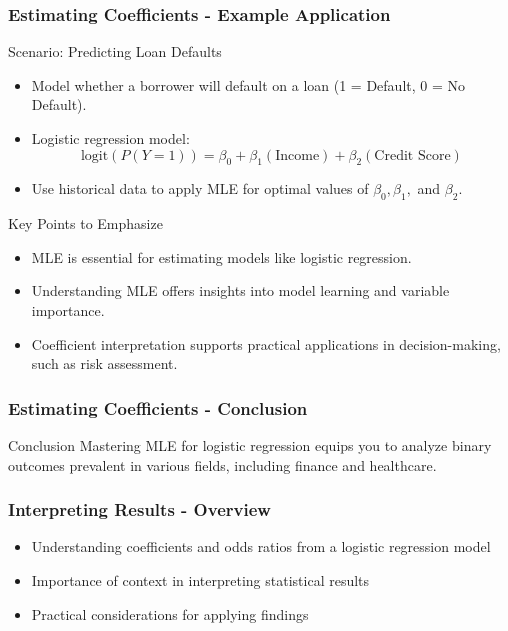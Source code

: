 \documentclass[aspectratio=169]{beamer}
\begin{document}
\begin{frame}[fragile]
    \frametitle{Estimating Coefficients - Example Application}
    \begin{block}{Scenario: Predicting Loan Defaults}
        \begin{itemize}
            \item Model whether a borrower will default on a loan (1 = Default, 0 = No Default).
            \item Logistic regression model:
                \begin{equation}
                    \text{logit}(P(Y=1)) = \beta_0 + \beta_1 (\text{Income}) + \beta_2 (\text{Credit Score})
                \end{equation}
            \item Use historical data to apply MLE for optimal values of \( \beta_0, \beta_1, \) and \( \beta_2 \).
        \end{itemize}
    \end{block}

    \begin{block}{Key Points to Emphasize}
        \begin{itemize}
            \item MLE is essential for estimating models like logistic regression.
            \item Understanding MLE offers insights into model learning and variable importance.
            \item Coefficient interpretation supports practical applications in decision-making, such as risk assessment.
        \end{itemize}
    \end{block}
\end{frame}

\begin{frame}[fragile]
    \frametitle{Estimating Coefficients - Conclusion}
    \begin{block}{Conclusion}
        Mastering MLE for logistic regression equips you to analyze binary outcomes prevalent in various fields, including finance and healthcare.
    \end{block}
\end{frame}

\begin{frame}[fragile]
    \frametitle{Interpreting Results - Overview}
    \begin{itemize}
        \item Understanding coefficients and odds ratios from a logistic regression model
        \item Importance of context in interpreting statistical results
        \item Practical considerations for applying findings
    \end{itemize}
\end{frame}
\end{document}
